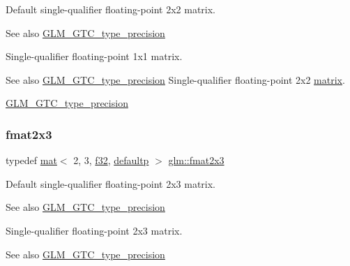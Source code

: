 Default single-\/qualifier floating-\/point 2x2 matrix. \begin{DoxySeeAlso}{See also}
\hyperlink{group__gtc__type__precision}{G\+L\+M\+\_\+\+G\+T\+C\+\_\+type\+\_\+precision}
\end{DoxySeeAlso}
Single-\/qualifier floating-\/point 1x1 matrix. \begin{DoxySeeAlso}{See also}
\hyperlink{group__gtc__type__precision}{G\+L\+M\+\_\+\+G\+T\+C\+\_\+type\+\_\+precision} Single-\/qualifier floating-\/point 2x2 \hyperlink{_s_d_l__opengl__glext_8h_a7b24a3f2f56eb1244ae69dacb4fecb6f}{matrix}. 

\hyperlink{group__gtc__type__precision}{G\+L\+M\+\_\+\+G\+T\+C\+\_\+type\+\_\+precision} 
\end{DoxySeeAlso}
\mbox{\label{group__gtc__type__precision_ga872da486765a299d84e9e8e6232ed306}} 
\subsubsection{\texorpdfstring{fmat2x3}{fmat2x3}}
{\footnotesize\ttfamily typedef \hyperlink{structglm_1_1mat}{mat}$<$ 2, 3, \hyperlink{group__gtc__type__precision_ga0ec999b57f5330d9021256e96038df04}{f32}, \hyperlink{namespaceglm_a36ed105b07c7746804d7fdc7cc90ff25a9d21ccd8b5a009ec7eb7677befc3bf51}{defaultp} $>$ \hyperlink{group__gtc__type__precision_ga872da486765a299d84e9e8e6232ed306}{glm\+::fmat2x3}}

Default single-\/qualifier floating-\/point 2x3 matrix. \begin{DoxySeeAlso}{See also}
\hyperlink{group__gtc__type__precision}{G\+L\+M\+\_\+\+G\+T\+C\+\_\+type\+\_\+precision}
\end{DoxySeeAlso}
Single-\/qualifier floating-\/point 2x3 matrix. \begin{DoxySeeAlso}{See also}
\hyperlink{group__gtc__type__precision}{G\+L\+M\+\_\+\+G\+T\+C\+\_\+type\+\_\+precision} 
\end{DoxySeeAlso}
\mbox{\label{group__gtc__type__precision_gabaf7537f5284456254b1da1cd6fd2b78}} 
